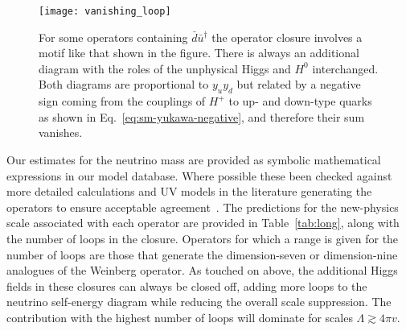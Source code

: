 \begin{figure}[t]
  \centering
  \texttt{[image: vanishing\_loop]}
  \caption{For some operators containing $\bar{d} \bar{u}^{\dagger}$ the
    operator closure involves a motif like that shown in the figure. There is
    always an additional diagram with the roles of the unphysical Higgs and
    $H^{0}$ interchanged. Both diagrams are proportional to $y_{u} y_{d}$ but
    related by a negative sign coming from the couplings of $H^{+}$ to up- and
    down-type quarks as shown in Eq.~\eqref{eq:sm-yukawa-negative}, and
    therefore their sum vanishes.}
  \label{fig:vanishing-loop}
\end{figure}

Our estimates for the neutrino mass are provided as symbolic mathematical
expressions in our model database. Where possible these been checked against
more detailed calculations and UV models in the literature generating the
operators to ensure acceptable agreement~\cite{Duerr:2011zd, Babu:2009aq,
  Babu:2010vp, delAguila:2012nu, Cai:2014kra, Zee:1985id, Babu:1988ki,
  Angel:2013hla, Gargalionis:2019drk}. The predictions for the new-physics scale
associated with each operator are provided in Table~\ref{tab:long}, along with
the number of loops in the closure. Operators for which a range is given for the
number of loops are those that generate the dimension-seven or dimension-nine
analogues of the Weinberg operator. As touched on above, the additional Higgs
fields in these closures can always be closed off, adding more loops to the
neutrino self-energy diagram while reducing the overall scale suppression. The
contribution with the highest number of loops will dominate for scales
$\Lambda \gtrsim 4\pi v$.

